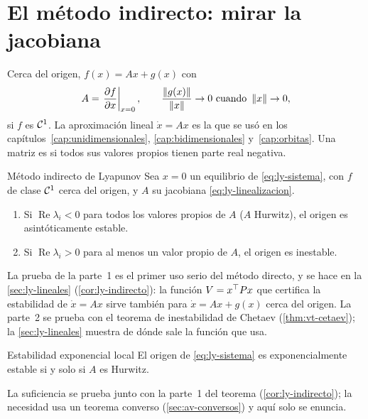 \section{El método indirecto: mirar la jacobiana}
\label{sec:ly-indirecto}

Cerca del origen, $f(x)=Ax+g(x)$ con
\begin{equation}
  A=\left.\frac{\partial f}{\partial x}\right|_{x=0},\qquad \frac{\left\lVert g(x)\right\rVert}{\left\lVert x\right\rVert}\to0\ \text{cuando}\ \left\lVert x\right\rVert\to0 ,
  \label{eq:ly-linealizacion}
\end{equation}
si $f$ es $\mathcal{C}^{1}$. La aproximación lineal $\dot x=Ax$ es la que se usó en los capítulos~\ref{cap:unidimensionales}, \ref{cap:bidimensionales} y~\ref{cap:orbitas}. Una matriz es  si todos sus valores propios tienen parte real negativa.

\begin{teorema}[label=thm:ly-indirecto]{Método indirecto de Lyapunov \citep[Teo.~4.7]{Kha02}}
Sea $x=0$ un equilibrio de \eqref{eq:ly-sistema}, con $f$ de clase $\mathcal{C}^{1}$ cerca del origen, y $A$ su jacobiana \eqref{eq:ly-linealizacion}.
\begin{enumerate}
  \item Si $\operatorname{Re}\lambda_i<0$ para todos los valores propios de $A$ ($A$ Hurwitz), el origen es asintóticamente estable.
  \item Si $\operatorname{Re}\lambda_i>0$ para al menos un valor propio de $A$, el origen es inestable.
\end{enumerate}
\end{teorema}

La prueba de la parte~1 es el primer uso serio del método directo, y se hace en la \cref{sec:ly-lineales} (\cref{cor:ly-indirecto}): la función $V=x^{\top} Px$ que certifica la estabilidad de $\dot x=Ax$ sirve también para $\dot x=Ax+g(x)$ cerca del origen. La parte~2 se prueba con el teorema de inestabilidad de Chetaev (\cref{thm:vt-cetaev}); la \cref{sec:ly-lineales} muestra de dónde sale la función que usa.

\begin{corolario}[label=cor:ly-exponencial]{Estabilidad exponencial local \citep[Cor.~4.3]{Kha02}}
El origen de \eqref{eq:ly-sistema} es exponencialmente estable si y solo si $A$ es Hurwitz.
\end{corolario}

La suficiencia se prueba junto con la parte~1 del teorema (\cref{cor:ly-indirecto}); la necesidad usa un teorema converso (\cref{sec:av-conversos}) y aquí solo se enuncia.

